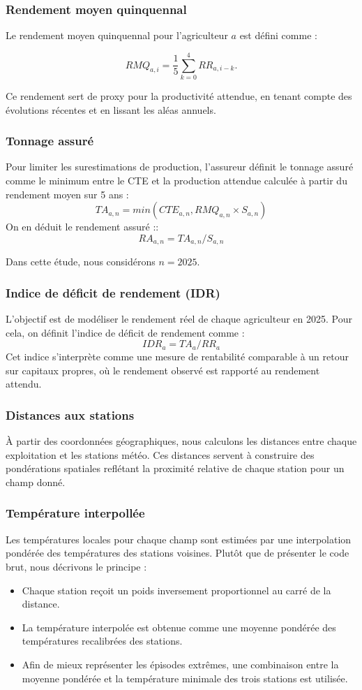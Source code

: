 \documentclass[11pt,a4paper,openright,twoside]{report}
\begin{document}
\subsubsection{Rendement moyen quinquennal}


Le rendement moyen quinquennal pour l’agriculteur $a$ est défini comme :

\[
RMQ_{a,i} = \frac{1}{5} \sum_{k=0}^{4} RR_{a,i-k}.
\]

Ce rendement sert de proxy pour la productivité attendue, en tenant compte des évolutions récentes et en lissant les aléas annuels.

\subsubsection{Tonnage assuré}
Pour limiter les surestimations de production, l’assureur définit le tonnage assuré comme le minimum entre le CTE et la production attendue calculée à partir du rendement moyen sur 5 ans :
\[TA_{a,n} = min(CTE_{a,n}, RMQ_{a,n} \times S_{a,n})\]
On en déduit le rendement assuré :: 
\[RA_{a,n} = TA_{a,n} / S_{a,n}\]

Dans cette étude, nous considérons $n = 2025$.

\subsubsection{Indice de déficit de rendement (IDR)}
L’objectif est de modéliser le rendement réel de chaque agriculteur en 2025. Pour cela, on définit l’indice de déficit de rendement comme : 
\[
IDR_{a} = TA_{a} / RR_{a}
\]
Cet indice s’interprète comme une mesure de rentabilité comparable à un retour sur capitaux propres, où le rendement observé est rapporté au rendement attendu.

\subsubsection{Distances aux stations}
À partir des coordonnées géographiques, nous calculons les distances entre chaque exploitation et les stations météo. Ces distances servent à construire des pondérations spatiales reflétant la proximité relative de chaque station pour un champ donné.


\subsubsection{Température interpollée}
Les températures locales pour chaque champ sont estimées par une interpolation pondérée des températures des stations voisines. Plutôt que de présenter le code brut, nous décrivons le principe :
\begin{itemize}
    \item Chaque station reçoit un poids inversement proportionnel au carré de la distance. 
    \item La température interpolée est obtenue comme une moyenne pondérée des températures recalibrées des stations.
    \item Afin de mieux représenter les épisodes extrêmes, une combinaison entre la moyenne pondérée et la température minimale des trois stations est utilisée.
\end{itemize}
\end{document}
